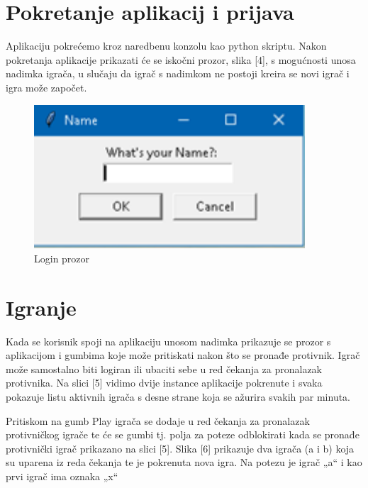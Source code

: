 \documentclass[]{foi} %
\begin{document}
\section{Pokretanje aplikacij i prijava}

Aplikaciju pokrećemo kroz naredbenu konzolu kao python skriptu. Nakon pokretanja aplikacije prikazati će se iskočni prozor, slika [4], s mogućnosti unosa nadimka igrača, u slučaju da igrač s nadimkom ne postoji kreira se novi igrač i igra može započet.


\begin{figure}[]
    \centering
    \includegraphics[width=0.9\textwidth]{slike/login.png}
    \caption{Login prozor \cite{Vlastita izrada}}
    \label{fig:podjela}
\end{figure}


\section{Igranje}

Kada se korisnik spoji na aplikaciju unosom nadimka prikazuje se prozor s aplikacijom i gumbima koje može pritiskati nakon što se pronađe protivnik. Igrač može samostalno biti logiran ili ubaciti sebe u red čekanja za pronalazak protivnika. Na slici [5] vidimo dvije instance aplikacije pokrenute i svaka pokazuje listu aktivnih igrača s desne strane koja se ažurira svakih par minuta.

Pritiskom na gumb Play igrača se dodaje u red čekanja za pronalazak protivničkog igrače te će se gumbi tj. polja za poteze odblokirati kada se pronađe protivnički igrač prikazano na slici [5]. Slika [6] prikazuje dva igrača (a i b) koja su uparena iz reda čekanja te je pokrenuta nova igra. Na potezu je igrač „a“ i kao prvi igrač ima oznaka „x“
\end{document}
